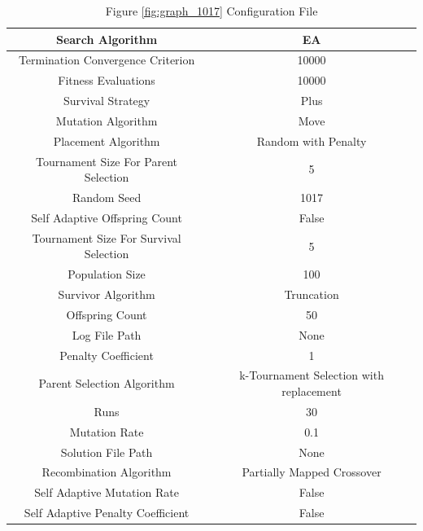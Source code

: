 \documentclass{standalone}
\begin{document}
\begin{table}[!htb]
	\centering
	\caption{Figure \ref{fig:graph_1017} Configuration File}
	\label{tab:graph_1017}
	\begin{tabular}{| c | c |}
		\hline
		Search Algorithm		& EA		 \\
		\hline
		Termination Convergence Criterion		& 10000		 \\
		\hline
		Fitness Evaluations		& 10000		 \\
		\hline
		Survival Strategy		& Plus		 \\
		\hline
		Mutation Algorithm		& Move		 \\
		\hline
		Placement Algorithm		& Random with Penalty		 \\
		\hline
		Tournament Size For Parent Selection		& 5		 \\
		\hline
		Random Seed		& 1017		 \\
		\hline
		Self Adaptive Offspring Count		& False		 \\
		\hline
		Tournament Size For Survival Selection		& 5		 \\
		\hline
		Population Size		& 100		 \\
		\hline
		Survivor Algorithm		& Truncation		 \\
		\hline
		Offspring Count		& 50		 \\
		\hline
		Log File Path		& None		 \\
		\hline
		Penalty Coefficient		& 1		 \\
		\hline
		Parent Selection Algorithm		& k-Tournament Selection with replacement		 \\
		\hline
		Runs		& 30		 \\
		\hline
		Mutation Rate		& 0.1		 \\
		\hline
		Solution File Path		& None		 \\
		\hline
		Recombination Algorithm		& Partially Mapped Crossover		 \\
		\hline
		Self Adaptive Mutation Rate		& False		 \\
		\hline
		Self Adaptive Penalty Coefficient		& False		 \\
		\hline
	\end{tabular}
\end{table}
\end{document}
